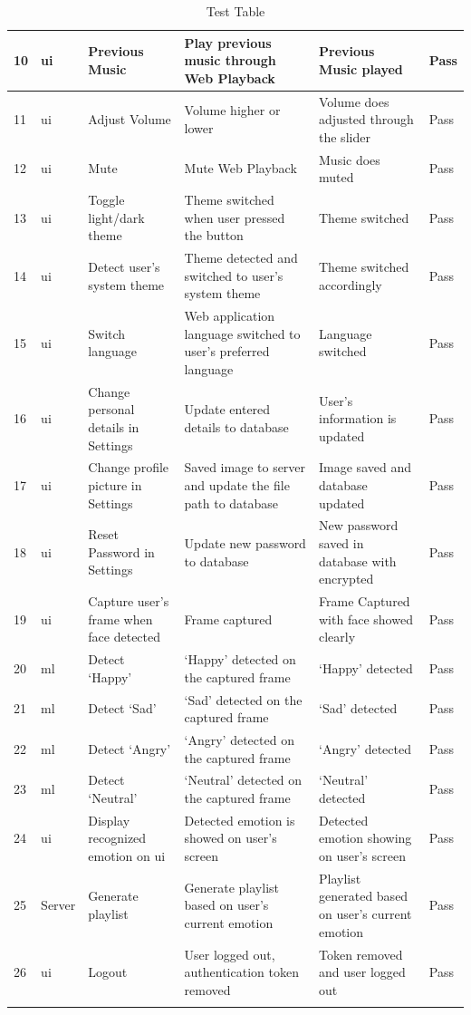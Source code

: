 \begin{landscape}
\begin{longtable}{ |m{1cm}|m{1.5cm}|m{5cm}|m{6cm}|m{6cm}|m{2cm}| }
    \hline
    10 & \gls{ui} & Previous Music & Play previous music through Web Playback &  Previous Music played & Pass \\
    \hline
    11 & \gls{ui} & Adjust Volume & Volume higher or lower & Volume does adjusted through the slider & Pass \\
    \hline
    12 & \gls{ui} & Mute & Mute Web Playback & Music does muted & Pass \\
    \hline
    13 & \gls{ui} & Toggle light/dark theme & Theme switched when user pressed the button & Theme switched & Pass \\
    \hline
    14 & \gls{ui} & Detect user's system theme & Theme detected and switched to user's system theme & Theme switched accordingly & Pass \\
    \hline
    15 & \gls{ui} & Switch language & Web application language switched to user's preferred language & Language switched & Pass\\
    \hline
    16 & \gls{ui} & Change personal details in Settings & Update entered details to database & User's information is updated & Pass\\
    \hline
    17 & \gls{ui} & Change profile picture in Settings & Saved image to server and update the file path to database & Image saved and database updated & Pass\\
    \hline
    18 & \gls{ui} & Reset Password in Settings & Update new password to database & New password saved in database with encrypted & Pass \\
    \hline
    19 & \gls{ui} & Capture user's frame when face detected & Frame captured & Frame Captured with face showed clearly & Pass \\
    \hline
    20 & \gls{ml} & Detect `Happy'  & `Happy' detected on the captured frame & `Happy' detected & Pass \\
    \hline
    21 & \gls{ml} & Detect `Sad'  & `Sad' detected on the captured frame & `Sad' detected & Pass \\
    \hline
    22 & \gls{ml} & Detect `Angry'  & `Angry' detected on the captured frame & `Angry' detected & Pass \\
    \hline
    23 & \gls{ml} & Detect `Neutral'  & `Neutral' detected on the captured frame & `Neutral' detected & Pass \\
    \hline
    24 & \gls{ui} & Display recognized emotion on \gls{ui} & Detected emotion is showed on user's screen & Detected emotion showing on user's screen & Pass \\
    \hline
    25 & Server & Generate playlist & Generate playlist based on user's current emotion & Playlist generated based on user's current emotion & Pass \\
    \hline
    26 & \gls{ui} & Logout & User logged out, authentication token removed & Token removed and user logged out & Pass \\
    \hline
    \caption{Test Table}
    \label{tab:test-case}
\end{longtable}
\end{landscape}

